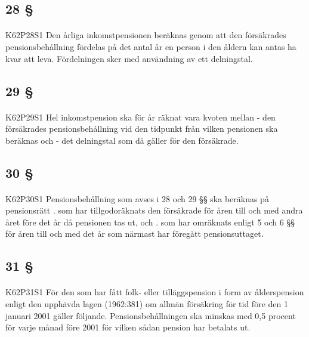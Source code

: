 \documentclass[a4paper,notitlepage,openany,10pt]{book}
\begin{document}
\subsection*{28 §}
\paragraph*{}
{\tiny K62P28S1}
Den årliga inkomstpensionen beräknas genom att den försäkrades pensionsbehållning fördelas på det antal år en person i den åldern kan antas ha kvar att leva. Fördelningen sker med användning av ett delningstal.
\subsection*{29 §}
\paragraph*{}
{\tiny K62P29S1}
Hel inkomstpension ska för år räknat vara kvoten mellan
\newline - den försäkrades pensionsbehållning vid den tidpunkt från vilken pensionen ska beräknas och - det delningstal som då gäller för den försäkrade.
\subsection*{30 §}
\paragraph*{}
{\tiny K62P30S1}
Pensionsbehållning som avses i 28 och 29 §§ ska beräknas på pensionsrätt
. som har tillgodoräknats den försäkrade för åren till och med andra året före det år då pensionen tas ut, och
. som har omräknats enligt 5 och 6 §§ för åren till och med det år som närmast har föregått pensionsuttaget.
\subsection*{31 §}
\paragraph*{}
{\tiny K62P31S1}
För den som har fått folk- eller tilläggspension i form av ålderspension enligt den upphävda lagen (1962:381) om allmän försäkring för tid före den 1 januari 2001 gäller följande. Pensionsbehållningen ska minskas med 0,5 procent för varje månad före 2001 för vilken sådan pension har betalats ut.
\end{document}
